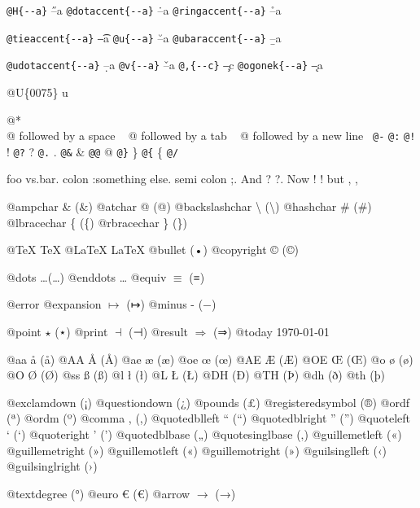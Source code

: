 \documentclass{book}
\renewcommand{\_}{\Texinfounderscore\discretionary{}{}{}}
\begin{document}
\texttt{@H\{{-}{-}a\}} \H{--a}
\texttt{@dotaccent\{{-}{-}a\}} \.{--a}
\texttt{@ringaccent\{{-}{-}a\}} \r{--a}

\texttt{@tieaccent\{{-}{-}a\}} \t{--a}
\texttt{@u\{{-}{-}a\}} \u{--a}
\texttt{@ubaraccent\{{-}{-}a\}} \b{--a}

\texttt{@udotaccent\{{-}{-}a\}} \d{--a}
\texttt{@v\{{-}{-}a\}} \v{--a}
\texttt{@,\{{-}{-}c\}} \c{--c}
\texttt{@ogonek\{{-}{-}a\}} \k{--a}

@U\{0075\} u

@* \leavevmode{}\\
@ followed by a space
\ {}
@ followed by a tab
\ {}
@ followed by a new line
\ {}\texttt{@-} \-{}
\texttt{@:} \@
\texttt{@!} \@!
\texttt{@?} \@?
\texttt{@.} \@.
\texttt{@\&} \&
\texttt{@@} @
\texttt{@\}} \}
\texttt{@\{} \{
\texttt{@/} 

foo vs.\@ bar. 
colon :\@And something else.
semi colon ;\@.
And ? ?\@.
Now ! !\@@
but , ,\@

@ampchar \& (\&)
@atchar @ (@)
@backslashchar \textbackslash{} (\textbackslash{})
@hashchar \# (\#)
@lbracechar \{ (\{)
@rbracechar \} (\})

@TeX \TeX{}
@LaTeX \LaTeX{}
@bullet \textbullet{} (•)
@copyright \copyright{} (©)

@dots \dots{}\@ (…)
@enddots \dots{}
@equiv $\equiv{}$ (≡)

@error 
@expansion $\mapsto{}$ (↦)
@minus - (−)

@point $\star{}$ (⋆)
@print $\dashv{}$ (⊣)
@result $\Rightarrow{}$ (⇒)
@today \today{}

@aa \aa{} (å)
@AA \AA{} (Å)
@ae \ae{} (æ)
@oe \oe{} (œ)
@AE \AE{} (Æ)
@OE \OE{} (Œ)
@o \o{} (ø)
@O \O{} (Ø)
@ss \ss{} (ß)
@l \l{} (ł)
@L \L{} (Ł)
@DH \DH{} (Ð)
@TH \TH{} (Þ)
@dh \dh{} (ð)
@th \th{} (þ)

@exclamdown \textexclamdown{} (¡)
@questiondown \textquestiondown{} (¿)
@pounds \textsterling{} (£)
@registeredsymbol \circledR{} (®)
@ordf \textordfeminine{} (ª)
@ordm \textordmasculine{} (º)
@comma , (,)
@quotedblleft \textquotedblleft{} (“)
@quotedblright \textquotedblright{} (”)
@quoteleft \textquoteleft{} (‘)
@quoteright \textquoteright{} (’)
@quotedblbase \quotedblbase{} („)
@quotesinglbase \quotesinglbase{} (‚)
@guillemetleft \guillemotleft{} («)
@guillemetright \guillemotright{} (»)
@guillemotleft \guillemotleft{} («)
@guillemotright \guillemotright{} (»)
@guilsinglleft \guilsinglleft{} (‹)
@guilsinglright \guilsinglright{} (›)

@textdegree \textdegree{} (°)
@euro \euro{} (€)
@arrow $\rightarrow{}$ (→)
\end{document}
